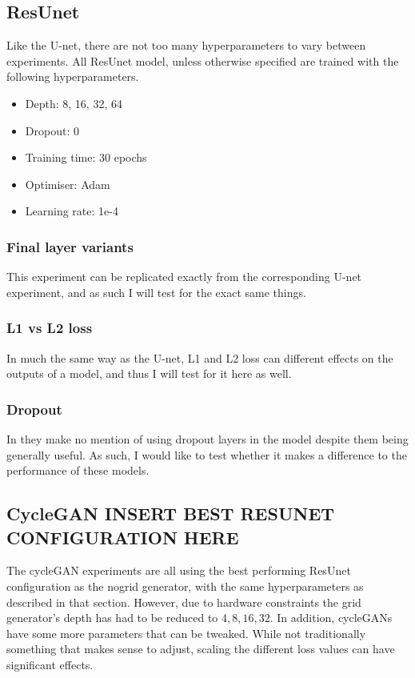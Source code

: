 \subsection{ResUnet}
Like the U-net, there are not too many hyperparameters to vary between experiments. All ResUnet model, unless otherwise specified are trained with the following hyperparameters.
\begin{itemize}
\item Depth: 8, 16, 32, 64
\item Dropout: 0
\item Training time: 30 epochs
\item Optimiser: Adam
\item Learning rate: 1e-4
\end{itemize}

\subsubsection{Final layer variants}
This experiment can be replicated exactly from the corresponding U-net experiment, and as such I will test for the exact same things.
\subsubsection{L1 vs L2 loss}
In much the same way as the U-net, L1 and L2 loss can different effects on the outputs of a model, and thus I will test for it here as well.
\subsubsection{Dropout}
In \cite{resunet} they make no mention of using dropout layers in the model despite them being generally useful. As such, I would like to test whether it makes a difference to the performance of these models.


\subsection{CycleGAN INSERT BEST RESUNET CONFIGURATION HERE}
The cycleGAN experiments are all using the best performing ResUnet configuration as the nogrid generator, with the same hyperparameters as described in that section. However, due to hardware constraints the grid generator's depth has had to be reduced to $4,8,16,32$.
In addition, cycleGANs have some more parameters that can be tweaked. While not traditionally something that makes sense to adjust, scaling the different loss values can have significant effects.

